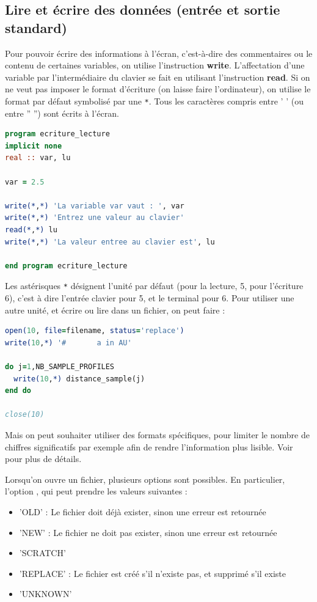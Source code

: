 \documentclass[a4paper,twoside]{article}
\begin{document}
\subsection{Lire et écrire des données (entrée et sortie standard)}
Pour pouvoir écrire des informations à l'écran, c'est-à-dire des commentaires ou le contenu de certaines variables, on utilise l'instruction \textbf{write}. L'affectation d'une variable par l'intermédiaire du clavier se fait en utilisant l'instruction \textbf{read}. Si on ne veut pas imposer le format d'écriture (on laisse faire l'ordinateur), on utilise le format par défaut symbolisé par une \texttt{*}. Tous les caractères compris entre ' ' (ou entre ” ”) sont écrits à l'écran.


\begin{lstlisting}[language=Fortran]
program ecriture_lecture
implicit none
real :: var, lu

var = 2.5

write(*,*) 'La variable var vaut : ', var
write(*,*) 'Entrez une valeur au clavier'
read(*,*) lu
write(*,*) 'La valeur entree au clavier est', lu

end program ecriture_lecture
\end{lstlisting}

Les astérisques \texttt{*} désignent l'unité par défaut (pour la lecture, 5, pour l'écriture 6), c'est à dire l'entrée clavier pour 5, et le terminal pour 6. Pour utiliser une autre unité, et écrire ou lire dans un fichier, on peut faire : 
\begin{lstlisting}[language=Fortran]
open(10, file=filename, status='replace')
write(10,*) '#       a in AU'

do j=1,NB_SAMPLE_PROFILES
  write(10,*) distance_sample(j)
end do

close(10)
\end{lstlisting}

Mais on peut souhaiter utiliser des formats spécifiques, pour limiter le nombre de chiffres significatifs par exemple afin de rendre l'information plus lisible. Voir  pour plus de détails.

\bigskip

Lorsqu'on ouvre un fichier, plusieurs options sont possibles. En particulier, l'option , qui peut prendre les valeurs suivantes :
\begin{itemize}
\item 'OLD' : Le fichier doit déjà exister, sinon une erreur est retournée
\item 'NEW' : Le fichier ne doit pas exister, sinon une erreur est retournée
\item 'SCRATCH'
\item 'REPLACE' : Le fichier est créé s'il n'existe pas, et supprimé s'il existe
\item 'UNKNOWN'
\end{itemize}
\end{document}
